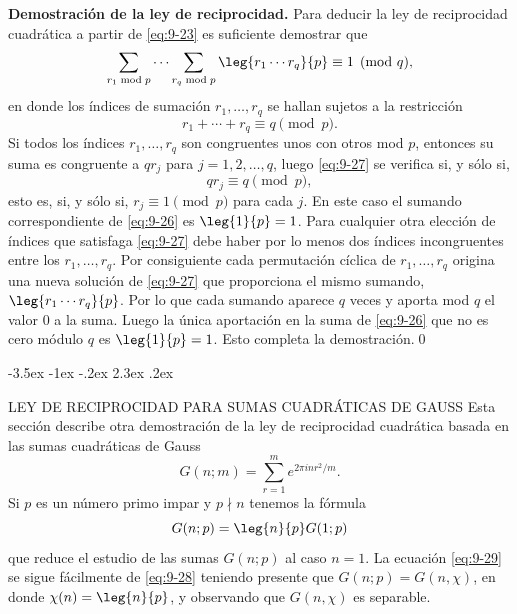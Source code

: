 \documentclass[12pt,a4paper]{book}
\makeatletter
\renewcommand\section{\@startsection{section}{1}{\z@}%
  {-3.5ex \@plus -1ex \@minus -.2ex}%
  {2.3ex \@plus .2ex}%
  {\normalfont\Large\bfseries\raggedright}}
\makeatother
\begin{document}
    \textbf{Demostración de la ley de reciprocidad.} Para deducir la ley de reciprocidad
    cuadrática a partir de \eqref{eq:9-23} es suficiente demostrar que
    \begin{equation}\label{eq:9-26}
        \sum_{r_{1}\bmod p}\cdots\sum_{r_{q}\bmod p}\leg{r_{1}\cdots r_{q}}{p}\equiv1\pmod{q},
    \end{equation}
    en donde los índices de sumación $r_{1},\dots,r_{q}$ se hallan sujetos a la restricción
    \begin{equation}\label{eq:9-27}
        r_{1}+\cdots+r_{q}\equiv q\pmod{p}.
    \end{equation}
    Si todos los índices $r_{1},\dots,r_{q}$ son congruentes unos con otros mod $p$, entonces
    su suma es congruente a $qr_{j}$ para $j=1,2,\dots,q$, luego \eqref{eq:9-27} se verifica
    si, y sólo si,
    \begin{equation*}
        qr_{j}\equiv q\pmod{p},
    \end{equation*}
    esto es, si, y sólo si, $r_{j}\equiv1\pmod{p}$ para cada $j$. En este caso el sumando
    correspondiente de \eqref{eq:9-26} es $\leg{1}{p}=1$. Para cualquier otra elección de
    índices que satisfaga \eqref{eq:9-27} debe haber por lo menos dos índices incongruentes
    entre los $r_{1},\dots,r_{q}$. Por consiguiente cada permutación cíclica de
    $r_{1},\dots,r_{q}$ origina una nueva solución de \eqref{eq:9-27} que proporciona el mismo
    sumando, $\leg{r_{1}\cdots r_{q}}{p}$. Por lo que cada sumando aparece $q$ veces y aporta
    mod $q$ el valor 0 a la suma. Luego la única aportación en la suma de \eqref{eq:9-26}
    que no es cero módulo $q$ es $\leg{1}{p}=1$. Esto completa la demostración.\qed

    \section{LEY DE RECIPROCIDAD PARA SUMAS CUADRÁTICAS DE GAUSS}
    Esta sección describe otra demostración de la ley de reciprocidad cuadrática basada en
    las sumas cuadráticas de Gauss
    \begin{equation}\label{eq:9-28}
        G(n;m)=\sum_{r=1}^{m}e^{2\pi inr^{2}/m}.
    \end{equation}
    Si $p$ es un número primo impar y $p\nmid n$ tenemos la fórmula
    \begin{equation}\label{eq:9-29}
        G(n;p)=\leg{n}{p}G(1;p)
    \end{equation}
    que reduce el estudio de las sumas $G(n;p)$ al caso $n=1$. La ecuación \eqref{eq:9-29}
    se sigue fácilmente de \eqref{eq:9-28} teniendo presente que $G(n;p)=G(n,\chi)$, en
    donde $\chi(n)=\leg{n}{p}$, y observando que $G(n,\chi)$ es separable.
\end{document}
